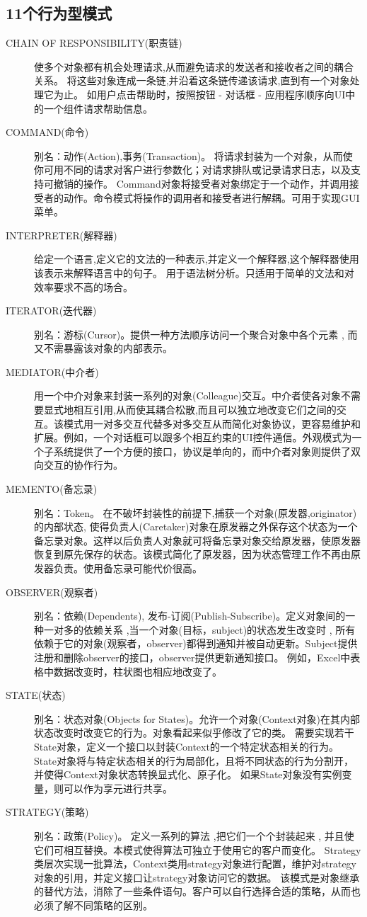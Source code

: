\subsection{11个行为型模式}
\begin{description}
\item [CHAIN OF RESPONSIBILITY(职责链)]
使多个对象都有机会处理请求,从而避免请求的发送者和接收者之间的耦合关系。
	将这些对象连成一条链,并沿着这条链传递该请求,直到有一个对象处理它为止。
	如用户点击帮助时，按照按钮 - 对话框 - 应用程序顺序向UI中的一个组件请求帮助信息。
\item [COMMAND(命令)]
别名：动作(Action),事务(Transaction)。
将请求封装为一个对象，从而使你可用不同的请求对客户进行参数化；对请求排队或记录请求日志，以及支持可撤销的操作。
Command对象将接受者对象绑定于一个动作，并调用接受者的动作。命令模式将操作的调用者和接受者进行解耦。可用于实现GUI菜单。
\item [INTERPRETER(解释器)]给定一个语言,定义它的文法的一种表示,并定义一个解释器,这个解释器使用该表示来解释语言中的句子。
用于语法树分析。只适用于简单的文法和对效率要求不高的场合。
\item [ITERATOR(迭代器)]
别名：游标(Cursor)。提供一种方法顺序访问一个聚合对象中各个元素 , 而又不需暴露该对象的内部表示。
\item [MEDIATOR(中介者)]
用一个中介对象来封装一系列的对象(Colleague)交互。中介者使各对象不需要显式地相互引用,从而使其耦合松散,而且可以独立地改变它们之间的交互。该模式用一对多交互代替多对多交互从而简化对象协议，更容易维护和扩展。例如，一个对话框可以跟多个相互约束的UI控件通信。外观模式为一个子系统提供了一个方便的接口，协议是单向的，而中介者对象则提供了双向交互的协作行为。
\item [MEMENTO(备忘录)]
别名：Token。
在不破坏封装性的前提下,捕获一个对象(原发器,originator)的内部状态, 使得负责人(Caretaker)对象在原发器之外保存这个状态为一个备忘录对象。这样以后负责人对象就可将备忘录对象交给原发器，使原发器恢复到原先保存的状态。该模式简化了原发器，因为状态管理工作不再由原发器负责。使用备忘录可能代价很高。
\item [OBSERVER(观察者)]
别名：依赖(Dependents), 发布-订阅(Publish-Subscribe)。定义对象间的一种一对多的依赖关系 ,当一个对象(目标，subject)的状态发生改变时 , 所有依赖于它的对象(观察者，observer)都得到通知并被自动更新。Subject提供注册和删除observer的接口，observer提供更新通知接口。
例如，Excel中表格中数据改变时，柱状图也相应地改变了。
\item [STATE(状态)]
别名：状态对象(Objects for States)。允许一个对象(Context对象)在其内部状态改变时改变它的行为。对象看起来似乎修改了它的类。
需要实现若干State对象，定义一个接口以封装Context的一个特定状态相关的行为。
State对象将与特定状态相关的行为局部化，且将不同状态的行为分割开，并使得Context对象状态转换显式化、原子化。
如果State对象没有实例变量，则可以作为享元进行共享。
\item [STRATEGY(策略)]
别名：政策(Policy)。
定义一系列的算法 ,把它们一个个封装起来 , 并且使它们可相互替换。本模式使得算法可独立于使用它的客户而变化。
Strategy类层次实现一批算法，Context类用strategy对象进行配置，维护对strategy对象的引用，并定义接口让strategy对象访问它的数据。
该模式是对象继承的替代方法，消除了一些条件语句。客户可以自行选择合适的策略，从而也必须了解不同策略的区别。


\end{description}
